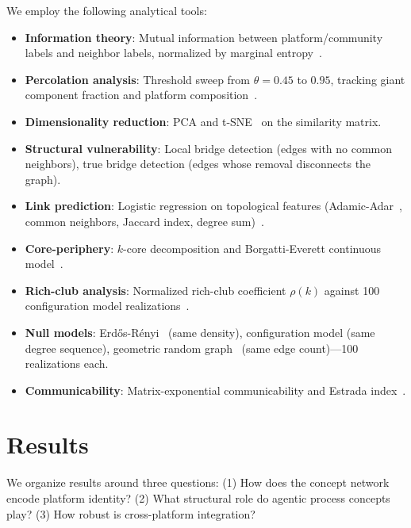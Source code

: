 \documentclass[11pt,twocolumn]{article}
\begin{document}
We employ the following analytical tools:
\begin{itemize}
  \item \textbf{Information theory}: Mutual information between platform/community labels and neighbor labels, normalized by marginal entropy~\citep{danon2005comparing}.
  \item \textbf{Percolation analysis}: Threshold sweep from $\theta = 0.45$ to $0.95$, tracking giant component fraction and platform composition~\citep{stauffer1994introduction,albert2000error}.
  \item \textbf{Dimensionality reduction}: PCA and t-SNE~\citep{vandermaaten2008visualizing} on the similarity matrix.
  \item \textbf{Structural vulnerability}: Local bridge detection (edges with no common neighbors), true bridge detection (edges whose removal disconnects the graph).
  \item \textbf{Link prediction}: Logistic regression on topological features (Adamic-Adar~\citep{adamic2003friends,libennowell2003link}, common neighbors, Jaccard index, degree sum)~\citep{lu2011link}.
  \item \textbf{Core-periphery}: $k$-core decomposition and Borgatti-Everett continuous model~\citep{borgatti2000models}.
  \item \textbf{Rich-club analysis}: Normalized rich-club coefficient $\rho(k)$ against 100 configuration model realizations~\citep{colizza2006detecting}.
  \item \textbf{Null models}: Erd\H{o}s-R\'enyi~\citep{erdos1960evolution} (same density), configuration model (same degree sequence), geometric random graph~\citep{penrose2003random} (same edge count)---100 realizations each.
  \item \textbf{Communicability}: Matrix-exponential communicability and Estrada index~\citep{estrada2008communicability}.
\end{itemize}


\section{Results}
\label{sec:results}

We organize results around three questions: (1) How does the concept network encode platform identity? (2) What structural role do agentic process concepts play? (3) How robust is cross-platform integration?
\end{document}
